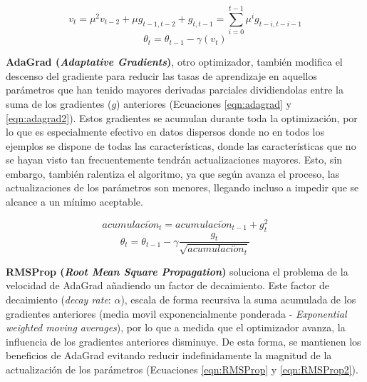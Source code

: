 \begin{equation}
\label{eqn:momento2}
v_t = \mu^2 v_{t-2} + \mu g_{t-1, t-2} + g_{t, t-1} = \sum_{i=0}^{t-1}\mu^{i}g_{t-i, t-i-1}
\end{equation}
\begin{equation}
\label{eqn:momento3}
\theta_t = \theta_{t-1} - \gamma (v_t)
\end{equation}

\textbf{AdaGrad (\textit{Adaptative Gradients})}, otro optimizador, también modifica el descenso del gradiente para reducir las tasas de aprendizaje en aquellos parámetros que han tenido mayores derivadas parciales dividiendolas entre la suma de los gradientes ($g$) anteriores (Ecuaciones \ref{eqn:adagrad} y \ref{eqn:adagrad2}). Estos gradientes se acumulan durante toda la optimización, por lo que es especialmente efectivo en datos dispersos donde no en todos los ejemplos se dispone de todas las características, donde las características que no se hayan visto tan frecuentemente tendrán actualizaciones mayores. Esto, sin embargo, también ralentiza el algoritmo, ya que según avanza el proceso, las actualizaciones de los parámetros son menores, llegando incluso a impedir que se alcance a un mínimo aceptable.

\begin{equation}
\label{eqn:adagrad}
acumulaci\acute{o}n_t = acumulaci\acute{o}n_{t-1} + g^{2}_{t}
\end{equation}
\begin{equation}
\label{eqn:adagrad2}
\theta_t = \theta_{t-1} - \gamma \frac{g_t}{\sqrt{acumulaci\acute{o}n_t}}
\end{equation}


\textbf{RMSProp (\textit{Root Mean Square Propagation})} soluciona el problema de la velocidad de AdaGrad añadiendo un factor de decaimiento. Este factor de decaimiento (\textit{decay rate}: $\alpha$), escala de forma recursiva la suma acumulada de los gradientes anteriores (media movil exponencialmente ponderada - \textit{Exponential weighted moving averages}), por lo que a medida que el optimizador avanza, la influencia de los gradientes anteriores disminuye. De esta forma, se mantienen los beneficios de AdaGrad evitando reducir indefinidamente la magnitud de la actualización de los parámetros (Ecuaciones \ref{eqn:RMSProp} y \ref{eqn:RMSProp2}).

